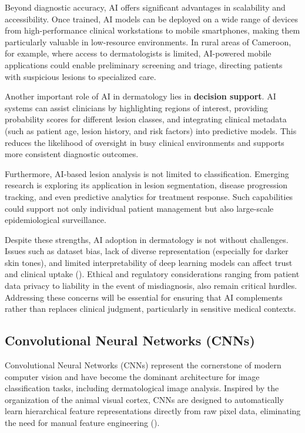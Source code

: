 \documentclass[
  12pt,
  oneside]{article}
\begin{document}
Beyond diagnostic accuracy, AI offers significant advantages in
scalability and accessibility. Once trained, AI models can be deployed
on a wide range of devices from high-performance clinical workstations
to mobile smartphones, making them particularly valuable in low-resource
environments. In rural areas of Cameroon, for example, where access to
dermatologists is limited, AI-powered mobile applications could enable
preliminary screening and triage, directing patients with suspicious
lesions to specialized care.

Another important role of AI in dermatology lies in \textbf{decision
support}. AI systems can assist clinicians by highlighting regions of
interest, providing probability scores for different lesion classes, and
integrating clinical metadata (such as patient age, lesion history, and
risk factors) into predictive models. This reduces the likelihood of
oversight in busy clinical environments and supports more consistent
diagnostic outcomes.

Furthermore, AI-based lesion analysis is not limited to classification.
Emerging research is exploring its application in lesion segmentation,
disease progression tracking, and even predictive analytics for
treatment response. Such capabilities could support not only individual
patient management but also large-scale epidemiological surveillance.

Despite these strengths, AI adoption in dermatology is not without
challenges. Issues such as dataset bias, lack of diverse representation
(especially for darker skin tones), and limited interpretability of deep
learning models can affect trust and clinical uptake
(). Ethical and
regulatory considerations ranging from patient data privacy to liability
in the event of misdiagnosis, also remain critical hurdles. Addressing
these concerns will be essential for ensuring that AI complements rather
than replaces clinical judgment, particularly in sensitive medical
contexts.

\subsection{Convolutional Neural Networks
(CNNs)}\label{convolutional-neural-networks-cnns}

Convolutional Neural Networks (CNNs) represent the cornerstone of modern
computer vision and have become the dominant architecture for image
classification tasks, including dermatological image analysis. Inspired
by the organization of the animal visual cortex, CNNs are designed to
automatically learn hierarchical feature representations directly from
raw pixel data, eliminating the need for manual feature engineering
().
\end{document}
